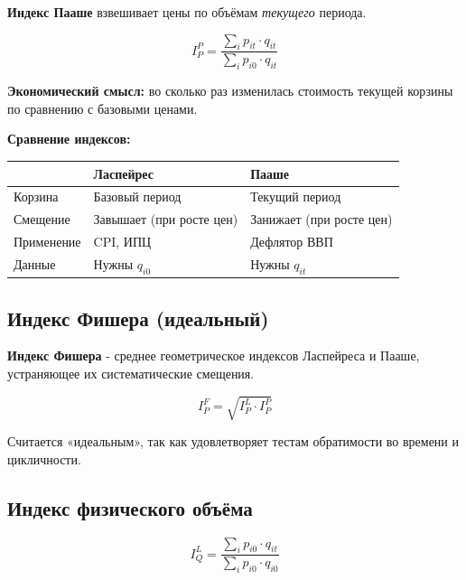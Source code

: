 \documentclass[a4paper]{article}
\begin{document}
	\textbf{Индекс Пааше} взвешивает цены по объёмам \emph{текущего} периода.


\begin{equation}
	I_P^P = \frac{\displaystyle\sum_{i} p_{it} \cdot q_{it}}
	{\displaystyle\sum_{i} p_{i0} \cdot q_{it}}
\end{equation}

\noindent\textbf{Экономический смысл:} во сколько раз изменилась стоимость
текущей корзины по сравнению с базовыми ценами.

\noindent\textbf{Сравнение индексов:}
\begin{center}
	\renewcommand{\arraystretch}{1.4}
	\begin{tabular}{p{3.5cm} p{4.5cm} p{4.5cm}}
		\toprule
		& \textbf{Ласпейрес} & \textbf{Пааше} \\
		\midrule
		Корзина & Базовый период & Текущий период \\
		Смещение & Завышает (при росте цен) & Занижает (при росте цен) \\
		Применение & CPI, ИПЦ & Дефлятор ВВП \\
		Данные & Нужны $q_{i0}$ & Нужны $q_{it}$ \\
		\bottomrule
	\end{tabular}
\end{center}

\subsection{Индекс Фишера (идеальный)}


	\textbf{Индекс Фишера} - среднее геометрическое индексов Ласпейреса и Пааше,
	устраняющее их систематические смещения.


\begin{equation}
	I_P^F = \sqrt{I_P^L \cdot I_P^P}
\end{equation}

Считается «идеальным», так как удовлетворяет тестам обратимости во времени
и цикличности.

\subsection{Индекс физического объёма}

\begin{equation}
	I_Q^L = \frac{\displaystyle\sum_{i} p_{i0} \cdot q_{it}}
	{\displaystyle\sum_{i} p_{i0} \cdot q_{i0}}
\end{equation}
\end{document}

